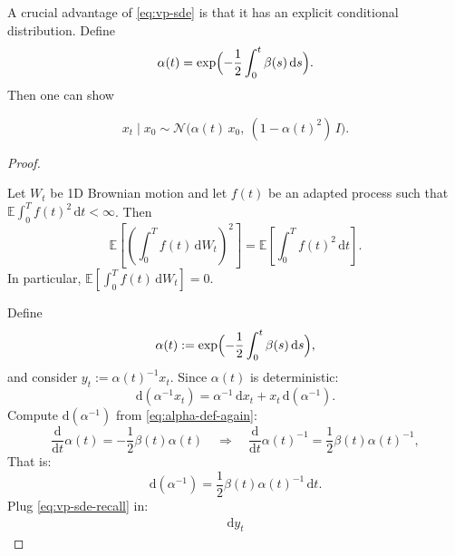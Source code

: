 \documentclass[../main]{subfiles}
\begin{document}
A crucial advantage of \eqref{eq:vp-sde} is that it has an explicit conditional distribution.
Define
\begin{equation}\label{eq:alpha-def}
    \alpha(t) = \exp\Bigl(-\frac{1}{2}\int_0^t \beta(s)\,\mathrm ds\Bigr).
\end{equation}
Then one can show
\begin{theorem}
\begin{equation}\label{eq:vp-marginal}
    x_t \mid x_0 \sim \mathcal N\!\bigl(\alpha(t)\,x_0,\ (1-\alpha(t)^2)\,I\bigr).
\end{equation}
\end{theorem}
\begin{proof}
    \begin{lemma}[It\^{o} isometry]
        Let $W_t$ be 1D Brownian motion and let $f(t)$ be an adapted process such that
        $\mathbb E\int_0^T f(t)^2\,\mathrm dt<\infty$. Then
        \begin{equation}
            \mathbb E\left[\left(\int_0^T f(t)\,\mathrm dW_t\right)^2\right]
            =
            \mathbb E\left[\int_0^T f(t)^2\,\mathrm dt\right].
        \end{equation}
        In particular, $\mathbb E\!\left[\int_0^T f(t)\,\mathrm dW_t\right]=0$.
        \end{lemma}
    Define
    \begin{equation}\label{eq:alpha-def-again}
        \alpha(t) := \exp\Bigl(-\frac12\int_0^t \beta(s)\,\mathrm ds\Bigr),
    \end{equation}
    and consider $y_t := \alpha(t)^{-1}x_t$. Since $\alpha(t)$ is deterministic:
    \begin{equation}
        \mathrm d(\alpha^{-1}x_t) = \alpha^{-1}\,\mathrm d x_t + x_t\,\mathrm d(\alpha^{-1}).
    \end{equation}
    Compute $\mathrm d(\alpha^{-1})$ from \eqref{eq:alpha-def-again}:
    \begin{equation}
        \frac{\mathrm d}{\mathrm dt}\alpha(t) = -\frac12\beta(t)\alpha(t)
        \quad\Rightarrow\quad
        \frac{\mathrm d}{\mathrm dt}\alpha(t)^{-1} = \frac12\beta(t)\alpha(t)^{-1},
    \end{equation}
    That is:
    \begin{equation}
        \mathrm d(\alpha^{-1}) = \frac12\beta(t)\alpha(t)^{-1}\,\mathrm dt.
    \end{equation}
    Plug \eqref{eq:vp-sde-recall} in:
    \begin{align}
        \mathrm d y_t

\end{align}
\end{proof}
\end{document}
